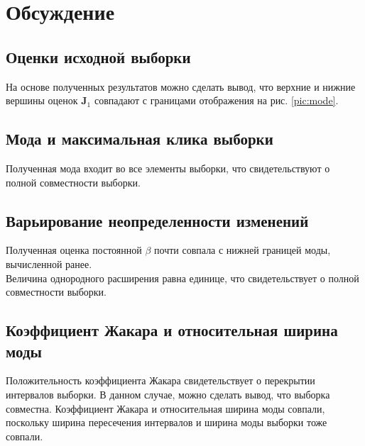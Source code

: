 \section{Обсуждение}

\subsection{Оценки исходной выборки} 

На основе полученных результатов можно сделать вывод, что верхние и нижние вершины оценок $\bm{J}_1$ совпадают с границами отображения на рис. \ref{pic:mode}.

\subsection{Мода и максимальная клика выборки} 

Полученная мода входит во все элементы выборки, что свидетельствуют о полной совместности выборки.

\subsection{Варьирование неопределенности изменений}

Полученная оценка постоянной $\beta$ почти совпала с нижней границей моды, вычисленной ранее. \\
Величина однородного расширения равна единице, что свидетельствует о полной совместности выборки.

\subsection{Коэффициент Жакара и относительная ширина моды}

Положительность коэффициента Жакара свидетельствует о перекрытии интервалов выборки. В данном случае, можно сделать вывод, что выборка совместна. Коэффициент Жакара и относительная ширина моды совпали, поскольку ширина пересечения интервалов и ширина моды выборки тоже совпали. \\

\newpage
